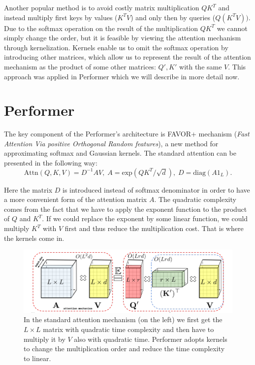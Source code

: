 \documentclass[magisterska,en]{pracamgr}
\begin{document}
Another popular method is to avoid costly matrix multiplication $QK^T$ and instead multiply first keys by values ($K^TV$) and only then by queries ($Q(K^TV))$. Due to the softmax operation on the result of the multiplication $QK^T$ we cannot simply change the order, but it is feasible by viewing the attention mechanism through kernelization. Kernels enable us to omit the softmax operation by introducing other matrices, which allow us to represent the result of the attention mechanism as the product of some other matrices: $Q', K'$ with the same $V$. This approach was applied in Performer \cite{DBLP:conf/iclr/ChoromanskiLDSG21} which we will describe in more detail now.


\section{Performer}\label{r:performer}


The key component of the Performer's architecture is  FAVOR+ mechanism (\textit{Fast Attention Via positive Orthogonal Random features}), a new method for approximating softmax and Gaussian kernels. The standard attention can be presented in the following way:
\begin{equation}
    \textrm{Attn}(Q, K, V) = D^{-1}AV, \; A=\textrm{exp}\left(QK^T/\sqrt{d}\right), \; 
    D = \textrm{diag}\left(A1_{L}\right).
\end{equation}\label{attention_equation}

Here the matrix $D$ is introduced instead of softmax denominator in order to have a more convenient form of the attention matrix $A$. The quadratic complexity comes from the fact that we have to apply the exponent function to the product of $Q$ and $K^T$. If we could replace the exponent by some linear function, we could multiply $K^T$ with $V$ first and thus reduce the multiplication cost. That is where the kernels come in. 


\begin{figure}[H]
\centering
\includegraphics[scale=0.5]{./images/performer.png}
\caption{In the standard attention mechanism (on the left) we first get the $L\times L$ matrix with quadratic time complexity and then have to multiply it by $V$ also with quadratic time. Performer adopts kernels to change the multiplication order and reduce the time complexity to linear.}
\end{figure}
\end{document}
